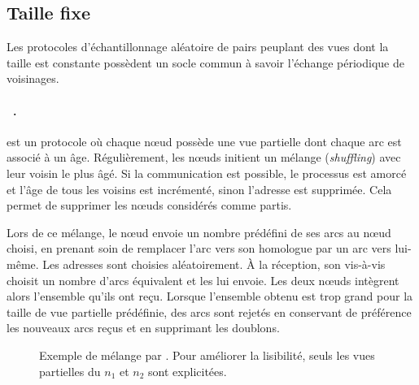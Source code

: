 \subsection{Taille fixe}
\label{net:subsec:fixed}

Les protocoles d'échantillonnage aléatoire de pairs peuplant des vues dont la
taille est constante possèdent un socle commun à savoir l'échange périodique
de voisinages.

\paragraph{\CYCLON~\cite{voulgaris2005cyclon}.} \CYCLON est un protocole où
chaque nœud possède une vue partielle dont chaque arc est associé à un
âge. Régulièrement, les nœuds initient un mélange (\emph{shuffling}) avec leur
voisin le plus âgé. Si la communication est possible, le processus est amorcé et
l'âge de tous les voisins est incrémenté, sinon l'adresse est supprimée. Cela
permet de supprimer les nœuds considérés comme partis.

\noindent Lors de ce mélange, le nœud envoie un nombre prédéfini de ses arcs au
nœud choisi, en prenant soin de remplacer l'arc vers son homologue par un arc
vers lui-même. Les adresses sont choisies aléatoirement. À la réception, son
vis-à-vis choisit un nombre d'arcs équivalent et les lui envoie. Les deux nœuds
intègrent alors l'ensemble qu'ils ont reçu. Lorsque l'ensemble obtenu est trop
grand pour la taille de vue partielle prédéfinie, des arcs sont rejetés en
conservant de préférence les nouveaux arcs reçus et en supprimant les doublons.
  
\begin{figure}
  \centering
  \hspace{35pt}
  \caption[Exemple de mélange dans \CYCLON]
  {\label{net:fig:cyclonexample} Exemple de mélange par \CYCLON. Pour
    améliorer la lisibilité, seuls les vues partielles du $n_1$ et $n_2$ sont
    explicitées.}
\end{figure}
  
